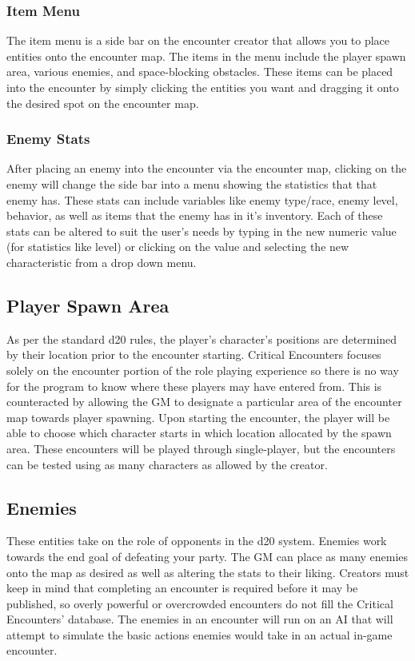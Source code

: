 \documentclass[12pt,a4paper]{report}
\begin{document}
			\subsubsection{Item Menu}
			The item menu is a side bar on the encounter creator that allows you to place entities onto the encounter map. The items in the menu include the player spawn area, various enemies, and space-blocking obstacles. These items can be placed into the encounter by simply clicking the entities you want and dragging it onto the desired spot on the encounter map.
			\subsubsection{Enemy Stats}
			After placing an enemy into the encounter via the encounter map, clicking on the enemy will change the side bar into a menu showing the statistics that that enemy has. These stats can include variables like enemy type/race, enemy level, behavior, as well as items that the enemy has in it's inventory. Each of these stats can be altered to suit the user's needs by typing in the new numeric value (for statistics like level) or clicking on the value and selecting the new characteristic from a drop down menu. 
		\subsection{Player Spawn Area}
		As per the standard d20 rules, the player's character's positions are determined by their location prior to the encounter starting. Critical Encounters focuses solely on the encounter portion of the role playing experience so there is no way for the program to know where these players may have entered from. This is counteracted by allowing the GM to designate a particular area of the encounter map towards player spawning. Upon starting the encounter, the player will be able to choose which character starts in which location allocated by the spawn area. These encounters will be played through single-player, but the encounters can be tested using as many characters as allowed by the creator.
		\subsection{Enemies}
		These entities take on the role of opponents in the d20 system. Enemies work towards the end goal of defeating your party. The GM can place as many enemies onto the map as desired as well as altering the stats to their liking. Creators must keep in mind that completing an encounter is required before it may be published, so overly powerful or overcrowded encounters do not fill the Critical Encounters' database. The enemies in an encounter will run on an AI that will attempt to simulate the basic actions enemies would take in an actual in-game encounter.
\end{document}
